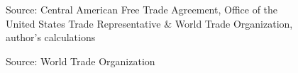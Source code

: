 \documentclass[12pt]{article}
\begin{document}
\begin{figure}[H]
%
\caption{\label{fig:Graph3}}
Source: Central American Free Trade Agreement, Office of the United States Trade Representative \&
World Trade Organization, author's calculations
\end{figure}

\begin{figure}[H]
%
\caption{\label{fig:Graph4}}
Source: World Trade Organization
\end{figure}
\end{document}
